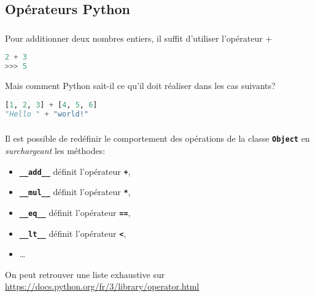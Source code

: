\documentclass[svgnames,11pt]{beamer}
\begin{document}
\subsection{Opérateurs Python}
\begin{frame}[fragile]
    \frametitle{}

    Pour additionner deux nombres entiers, il suffit d'utiliser l'opérateur $+$
\begin{center}
\begin{lstlisting}[language=Python , basicstyle=\ttfamily\small, xleftmargin=2em, xrightmargin=1em]
2 + 3
>>> 5
\end{lstlisting}
\end{center}
Mais comment Python sait-il ce qu'il doit réaliser dans les cas suivants?
\begin{center}
\begin{lstlisting}[language=Python , basicstyle=\ttfamily\small, xleftmargin=2em, xrightmargin=1em]
[1, 2, 3] + [4, 5, 6]
"Hello " + "world!"
\end{lstlisting}
\label{CODE}
\end{center}

\end{frame}

\begin{frame}
    \frametitle{}
    Il est possible de redéfinir le comportement des opérations de la classe \textbf{\texttt{Object}} en \emph{surchargeant} les méthodes:
    \begin{itemize}
        \item  \textbf{\texttt{\_\_add\_\_}} définit l'opérateur \textbf{\texttt{+}},
        \item  \textbf{\texttt{\_\_mul\_\_}} définit l'opérateur \textbf{\texttt{*}},
        \item \textbf{\texttt{\_\_eq\_\_}} définit l'opérateur \textbf{\texttt{==}},
        \item \textbf{\texttt{\_\_lt\_\_}} définit l'opérateur \textbf{\texttt{<}},
        \item \dots
    \end{itemize}
    On peut retrouver une liste exhaustive sur \url{https://docs.python.org/fr/3/library/operator.html}

\end{frame}
\end{document}
